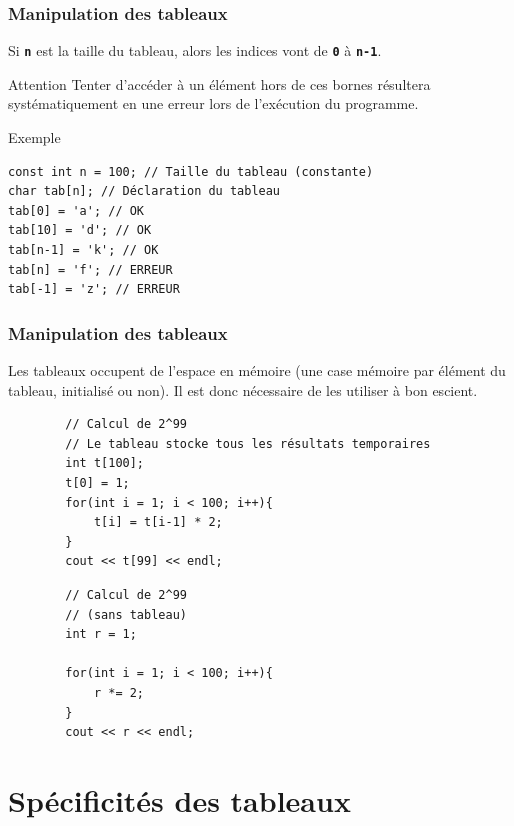 \begin{frame}[fragile]
	\frametitle{Manipulation des tableaux}
	Si \texttt{\textbf{n}} est la taille du tableau, alors les indices vont de \texttt{\textbf{0}} à \texttt{\textbf{n-1}}.
    
    \begin{alertblock}{Attention}
    Tenter d'accéder à un élément hors de ces bornes résultera systématiquement en une erreur lors de l'exécution du programme.
    \end{alertblock}
	
    \begin{exampleblock}{Exemple}
	\begin{verbatim}
const int n = 100; // Taille du tableau (constante)
char tab[n]; // Déclaration du tableau
tab[0] = 'a'; // OK
tab[10] = 'd'; // OK
tab[n-1] = 'k'; // OK
tab[n] = 'f'; // ERREUR
tab[-1] = 'z'; // ERREUR
	\end{verbatim}
    \end{exampleblock}
\end{frame}
	
\begin{frame}[fragile]
	\frametitle{Manipulation des tableaux}
	Les tableaux occupent de l'espace en mémoire (une case mémoire par élément du tableau, initialisé ou non). Il est donc nécessaire de les utiliser à bon escient.
	
    \begin{minipage}{0.49\linewidth}
        \begin{verbatim}
        // Calcul de 2^99
        // Le tableau stocke tous les résultats temporaires
        int t[100];
        t[0] = 1;
        for(int i = 1; i < 100; i++){
            t[i] = t[i-1] * 2;
        }
        cout << t[99] << endl;
        \end{verbatim}
    \end{minipage}
    \begin{minipage}{0.49\linewidth}
        \begin{verbatim}
        // Calcul de 2^99
        // (sans tableau)
        int r = 1;
        
        for(int i = 1; i < 100; i++){
            r *= 2;
        }
        cout << r << endl;
        \end{verbatim}
    \end{minipage}
\end{frame}

\section{Spécificités des tableaux}

